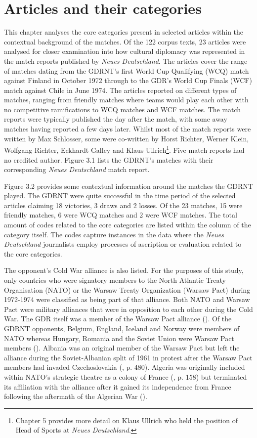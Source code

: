 \chapter{Articles and their categories\label{cha:articles}}

This chapter analyses the core categories present in selected articles within the contextual background of the matches. Of the 122 corpus texts, 23 articles were analysed for closer examination into how cultural diplomacy was represented in the match reports published by \textit{Neues Deutschland}. The articles cover the range of matches dating from the GDRNT's first World Cup Qualifying (WCQ) match against Finland in October 1972 through to the GDR’s World Cup Finals (WCF) match against Chile in June 1974. The articles reported on different types of matches, ranging from friendly matches where teams would play each other with no competitive ramifications to WCQ matches and WCF matches. The match reports were typically published the day after the match, with some away matches having reported a few days later. Whilst most of the match reports were written by Max Schlosser, some were co-written by Horst Richter, Werner Klein, Wolfgang Richter, Eckhardt Galley and Klaus Ullrich\footnote{Chapter 5 provides more detail on Klaus Ullrich who held the position of Head of Sports at \textit{Neues Deutschland}.}. Five match reports had no credited author. Figure 3.1 lists the GDRNT’s matches with their corresponding \textit{Neues Deutschland} match report.

Figure 3.2 provides some contextual information around the matches the GDRNT played. The GDRNT were quite successful in the time period of the selected articles claiming 18 victories, 3 draws and 2 losses. Of the 23 matches, 15 were friendly matches, 6 were WCQ matches and 2 were WCF matches. The total amount of codes related to the core categories are listed within the column of the category itself. The codes capture instances in the data where the \textit{Neues Deutschland} journalists employ processes of ascription or evaluation related to the core categories.

The opponent’s Cold War alliance is also listed. For the purposes of this study, only countries who were signatory members to the North Atlantic Treaty Organisation (NATO) or the Warsaw Treaty Organization (Warsaw Pact) during 1972-1974 were classified as being part of that alliance. Both NATO and Warsaw Pact were military alliances that were in opposition to each other during the Cold War. The GDR itself was a member of the Warsaw Pact alliance (\cite{wagner2012}). Of the GDRNT opponents, Belgium, England, Iceland and Norway were members of NATO whereas Hungary, Romania and the Soviet Union were Warsaw Pact members (\cite{wagner2012}). Albania was an original member of the Warsaw Pact but left the alliance during the Soviet-Albanian split of 1961 in protest after the Warsaw Pact members had invaded Czechoslovakia (\cite{lüthi2007}, p. 480). Algeria was originally included within NATO’s strategic theatre as a colony of France (\cite{thomas2000}, p. 158) but terminated its affiliation with the alliance after it gained its independence from France following the aftermath of the Algerian War (\cite{connelly2002}).

